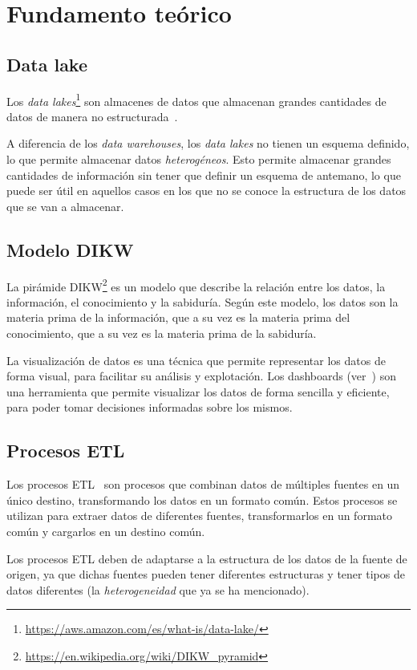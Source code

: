 \chapter{Fundamento teórico}\label{chap:teoria}
\section{Data lake}\label{sec:datalake}
Los \textit{data lakes}\footnote{\url{https://aws.amazon.com/es/what-is/data-lake/}}
son almacenes de datos que almacenan grandes cantidades de datos de manera no
estructurada~\cite{mier2023dashboards}.

A diferencia de los \textit{data warehouses}, los \textit{data lakes} no tienen un
esquema definido, lo que permite almacenar datos \textit{heterogéneos}. Esto permite
almacenar grandes cantidades de información sin tener que definir un esquema de antemano,
lo que puede ser útil en aquellos casos en los que no se conoce la estructura de los
datos que se van a almacenar.


\section{Modelo DIKW}\label{sec:dikw}
La pirámide DIKW\footnote{\url{https://en.wikipedia.org/wiki/DIKW_pyramid}} es un modelo que
describe la relación entre los datos, la información, el conocimiento y la sabiduría. Según este
modelo, los datos son la materia prima de la información, que a su vez es la materia prima del
conocimiento, que a su vez es la materia prima de la sabiduría.

La visualización de datos es una técnica que permite representar los datos de forma visual, para
facilitar su análisis y explotación. Los dashboards (ver~) son una
herramienta que permite visualizar los datos de forma sencilla y eficiente, para poder tomar
decisiones informadas sobre los mismos.

\section{Procesos ETL}\label{sec:etl}
Los procesos ETL~\cite{mier2023dashboards} son procesos que combinan datos de múltiples
fuentes en un único destino, transformando los datos en un formato común. Estos procesos
se utilizan para extraer datos de diferentes fuentes, transformarlos en un formato común
y cargarlos en un destino común.

Los procesos ETL deben de adaptarse a la estructura de los datos de la fuente de origen,
ya que dichas fuentes pueden tener diferentes estructuras y tener tipos de datos diferentes
(la \textit{heterogeneidad} que ya se ha mencionado).

